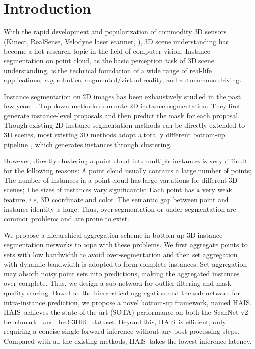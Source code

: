 \documentclass[10pt,twocolumn,letterpaper]{article}
\newcommand{\thename}{HAIS}
\def\eg{\emph{e.g}\onedot} \def\Eg{\emph{E.g}\onedot}
\def\ie{\emph{i.e}\onedot} \def\Ie{\emph{I.e}\onedot}
\begin{document}
\let\thefootnote\relax{}


\section{Introduction}
With the rapid development and popularization of commodity 3D sensors (Kinect, RealSense, Velodyne laser scanner, \etc), 3D scene understanding has become a hot research topic in the field of computer vision. Instance segmentation on point cloud, as the basic perception task of 3D scene understanding, is the technical foundation of a wide range of real-life applications, \eg, robotics, augmented/virtual reality, and autonomous driving.
 
Instance segmentation on 2D images has been exhaustively studied in the past few years~\cite{ISFCN,FCIS,MaskRCNN,PANet,MSRCNN,HTC,BMaskRCNN, QueryInst}. Top-down methods dominate 2D instance segmentation. They first generate instance-level proposals and then predict the mask for each proposal.
Though existing 2D instance segmentation methods can be directly extended to 3D scenes, most existing 3D methods adopt a totally different bottom-up pipeline~\cite{ASIS,SGPN,MTML,OccuSeg,PointGroup}, which generates instances through clustering.

However, directly clustering a point cloud into multiple instances is very difficult for the following reasons:  A point cloud usually contains a large number of points;  The number of instances in a point cloud has large variations for different 3D scenes;  The sizes of instances vary significantly;  Each point has a very weak feature, \ie, 3D coordinate and color. The semantic gap between point and instance identity is huge.
Thus, over-segmentation or under-segmentation are common problems and are prone to exist.

We propose a hierarchical aggregation scheme in bottom-up 3D instance segmentation networks to cope with these problems.
We first aggregate points to sets with low bandwidth to avoid over-segmentation and then set aggregation with dynamic bandwidth is adopted to form complete instances. 
Set aggregation may absorb noisy point sets into predictions, making the aggregated instances over-complete. Thus, we design a sub-network for outlier filtering and mask quality scoring. Based on the hierarchical aggregation and the sub-network for intra-instance prediction, we propose a novel bottom-up framework, named \thename. 
\thename\ achieves the state-of-the-art (SOTA) performance on both the ScanNet v2 benchmark~\cite{ScanNet} and the S3DIS~\cite{S3DIS} dataset. 
Beyond this, \thename\ is efficient, only requiring a concise single-forward inference without any post-processing steps. Compared with all the existing methods, \thename\ takes the lowest inference latency.
\end{document}
